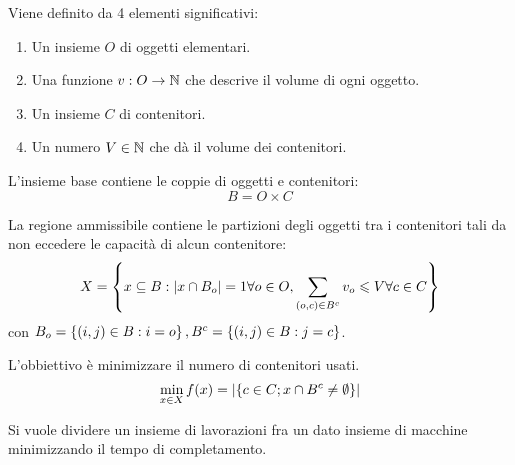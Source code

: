 \documentclass[\main/main.tex]{subfiles}
\begin{document}
\begin{multicols}{2}
\begin{problem}
        Viene definito da 4 elementi significativi:
        \begin{enumerate}
            \item Un insieme \(O\) di oggetti elementari.
            \item Una funzione \(v: O \rightarrow \mathbb{N} \) che descrive il volume di ogni oggetto.
            \item Un insieme \(C\) di contenitori.
            \item Un numero \(V \in \mathbb{N}\) che dà il volume dei contenitori.
        \end{enumerate}
    \end{problem}
    \begin{definition}
        L'insieme base contiene le coppie di oggetti e contenitori:
        \[
            B = O \times C
        \]
    \end{definition}
    \begin{definition}
        La regione ammissibile contiene le partizioni degli oggetti tra i contenitori tali da non eccedere le capacità di alcun contenitore:
        \[
            X = \left\{x \subseteq B: \left\lvert x \cap B_o\right\rvert = 1 \forall o \in O, \sum_{\left(o, c\right) \in B^c} v_o \leqslant V \forall c \in C\right\}
        \]
        con \(B_o = \left\{\left(i,j\right) \in B: i=o\right\}, B^c = \left\{\left(i,j\right) \in B: j=c\right\}\).
    \end{definition}
    \begin{definition}
        L'obbiettivo è minimizzare il numero di contenitori usati.
        \[
            \min_{x \in X} f(x) = \left\lvert\left\{c \in C; x \cap B^c \neq \emptyset\right\}\right\rvert
        \]
    \end{definition}
    \begin{problem}
        Si vuole dividere un insieme di lavorazioni fra un dato insieme di macchine minimizzando il tempo di completamento.
    

\end{problem}
\end{multicols}
\end{document}
